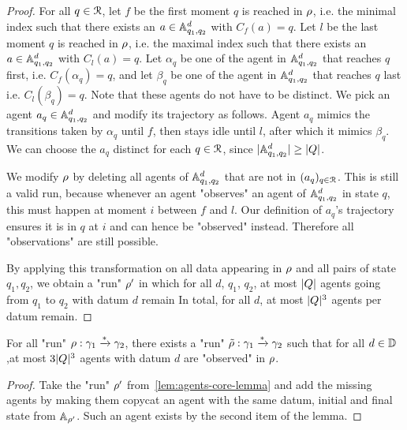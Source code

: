 \begin{proof}
For all $q \in \mathcal{R}$, 
let $f$ be the first moment $q$ is reached in $\rho$, 
i.e. the minimal index such that there exists an $a\in \mathbb{A}^d_{q_1, q_2}$
with $C_f(a)=q$.
Let $l$ be the last moment $q$ is reached in $\rho$, 
i.e. the maximal index such that there exists an $a\in \mathbb{A}^d_{q_1, q_2}$
with $C_l(a)=q$.
Let $\alpha_q$ be one of the agent in $\mathbb{A}^d_{q_1, q_2}$ that reaches $q$ first,
i.e. $C_f(\alpha_q)=q$, and 
let $\beta_q$ be one of the agent in $\mathbb{A}^d_{q_1, q_2}$ that reaches $q$ last
i.e. $C_l(\beta_q)=q$. 
Note that these agents do not have to be distinct.
We pick an agent $a_q \in \mathbb{A}^d_{q_1, q_2}$ and modify its trajectory as follows.
Agent $a_q$ mimics the transitions taken by $\alpha_q$ until $f$, 
then stays idle until $l$, after which it mimics $\beta_q$. 
We can choose the $a_q$ distinct for each $q\in \mathcal{R}$, since $|\mathbb{A}^d_{q_1, q_2}| \geq |Q|$.

We modify $\rho$ by deleting all agents of $\mathbb{A}^d_{q_1, q_2}$ that are not in $(a_q)_{q \in \mathcal{R}}$.
This is still a valid run, because whenever an agent "observes" an agent of $\mathbb{A}^d_{q_1, q_2}$ in state $q$, 
 this must happen at moment $i$ between $f$ and $l$. 
 Our definition of $a_q$'s trajectory ensures it  is in $q$ at $i$ and can hence be "observed" instead. 
 Therefore all "observations" are still possible.
	
By applying this transformation on all data appearing in $\rho$ and all pairs of state $q_1, q_2$, 
we obtain a "run" $\rho'$ in which for all $d$, $q_1$, $q_2$, 
at most $|Q|$ agents going from $q_1$ to $q_2$ with datum $d$ remain 
In total, for all $d$, at most $|Q|^3$ agents per datum remain.
\end{proof}

\begin{corollary}
	For all "run" $\rho : \gamma_1 \xrightarrow{*} \gamma_2$, there exists a "run" $\Tilde{\rho} : \gamma_1 \xrightarrow{*} \gamma_2$ such that for all $d \in \mathbb{D}$,at most $3|Q|^3$ agents with datum $d$ are "observed" in $\rho$.
\end{corollary}

\begin{proof}
	Take the "run" $\rho'$ from~\cref{lem:agents-core-lemma} and add the missing agents by making them copycat an agent with the same datum, initial and final state from $\mathbb{A}_{\rho'}$. Such an agent exists by the second item of the lemma.
\end{proof}

